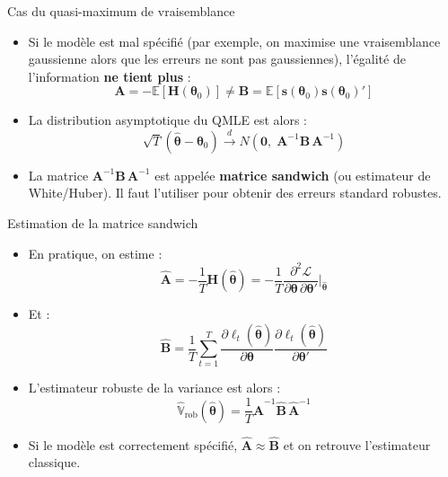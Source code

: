 \documentclass[11pt,aspectratio=169]{beamer}
\newcommand{\E}{\mathbb{E}}
\newcommand{\Var}{\mathbb{V}}
\begin{document}
\begin{frame}{Cas du quasi-maximum de vraisemblance}

\begin{itemize}

\item Si le modèle est mal spécifié (par exemple, on maximise une vraisemblance gaussienne alors que les erreurs ne sont pas gaussiennes), l'égalité de l'information \textbf{ne tient plus} :
  \[
  \mathbf{A} = -\E\!\left[\mathbf{H}(\bm{\theta}_0)\right] \neq \mathbf{B} = \E\!\left[\mathbf{s}(\bm{\theta}_0)\mathbf{s}(\bm{\theta}_0)'\right]
  \]\newline

\item La distribution asymptotique du QMLE est alors :
  \[
  \sqrt{T}\left(\hat{\bm{\theta}} - \bm{\theta}_0\right) \xrightarrow{d} N\!\left(\mathbf{0},\; \mathbf{A}^{-1}\mathbf{B}\,\mathbf{A}^{-1}\right)
  \]\newline

\item La matrice $\mathbf{A}^{-1}\mathbf{B}\,\mathbf{A}^{-1}$ est appelée \textbf{matrice sandwich} (ou estimateur de White/Huber). Il faut l'utiliser pour obtenir des erreurs standard robustes.

\end{itemize}

\end{frame}

\begin{frame}{Estimation de la matrice sandwich}

\begin{itemize}

\item En pratique, on estime :
  \[
  \hat{\mathbf{A}} = -\frac{1}{T}\mathbf{H}(\hat{\bm{\theta}}) = -\frac{1}{T}\frac{\partial^2 \mathcal{L}}{\partial \bm{\theta}\, \partial \bm{\theta}'}\bigg|_{\hat{\bm{\theta}}}
  \]\newline

\item Et :
  \[
  \hat{\mathbf{B}} = \frac{1}{T}\sum_{t=1}^{T} \frac{\partial \ell_t(\hat{\bm{\theta}})}{\partial \bm{\theta}} \frac{\partial \ell_t(\hat{\bm{\theta}})}{\partial \bm{\theta}'}
  \]\newline

\item L'estimateur robuste de la variance est alors :
  \[
  \widehat{\Var}_{\text{rob}}(\hat{\bm{\theta}}) = \frac{1}{T}\hat{\mathbf{A}}^{-1}\hat{\mathbf{B}}\,\hat{\mathbf{A}}^{-1}
  \]\newline

\item Si le modèle est correctement spécifié, $\hat{\mathbf{A}} \approx \hat{\mathbf{B}}$ et on retrouve l'estimateur classique.

\end{itemize}

\end{frame}
\end{document}
